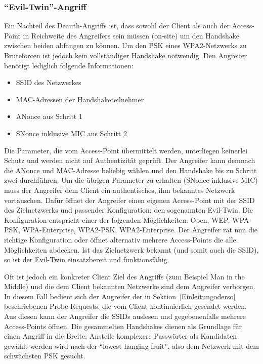 \subsubsection{\enquote{Evil-Twin}-Angriff}\label{subs:evil-twin-attack}
Ein Nachteil des Deauth-Angriffs ist, dass sowohl der Client als auch der Access-Point in Reichweite des Angreifers sein müssen (on-site) um den Handshake zwischen beiden abfangen zu können.
Um den PSK eines WPA2-Netzwerks zu Bruteforcen ist jedoch kein vollständiger Handshake notwendig.
Den Angreifer benötigt lediglich folgende Informationen:
\begin{itemize}
	\item SSID des Netzwerkes 
	\item MAC-Adressen der Handshaketeilnehmer
	\item ANonce aus Schritt 1
	\item SNonce inklusive MIC aus Schritt 2
\end{itemize}
Die Parameter, die vom Access-Point übermittelt werden, unterliegen keinerlei Schutz und werden nicht auf Authentizität geprüft.
Der Angreifer kann demnach die ANonce und MAC-Adresse beliebig wählen und den Handshake bis zu Schritt zwei durchführen.
Um die übrigen Parameter zu erhalten (SNonce inklusive MIC) muss der Angreifer dem Client ein authentisches, ihm bekanntes Netzwerk vortäuschen.
Dafür öffnet der Angreifer einen eigenen Access-Point mit der SSID des Zielnetzwerks und passender Konfiguration: den sogenannten Evil-Twin.
Die Konfiguration entspricht einer der folgenden Möglichkeiten: Open, WEP, WPA-PSK, WPA-Enterprise, WPA2-PSK, WPA2-Enterprise.
Der Angreifer rät nun die richtige Konfiguration oder öffnet alternativ mehrere Access-Points die alle Möglichkeiten abdecken.
Ist das Zielnetzwerk bekannt (und somit auch die SSID), so ist der Evil-Twin einsatzbereit und funktionsfähig.

Oft ist jedoch ein konkreter Client Ziel des Angriffs (zum Beispiel Man in the Middle) und die dem Client bekannten Netzwerke sind dem Angreifer verborgen.
In diesem Fall bedient sich der Angreifer der in Sektion~\ref{Einleitungoderso} beschriebenen Probe-Requests, die vom Client kontinuierlich gesendet werden.
Aus diesen kann der Angreifer die SSIDs auslesen und gegebenenfalls mehrere Access-Points öffnen.
Die gesammelten Handshakes dienen als Grundlage für einen Angriff in die Breite: Anstelle komplexere Passwörter als Kandidaten gewählt werden wird nach der \enquote{lowest hanging fruit}, also dem Netzwerk mit dem schwächsten PSK gesucht.

